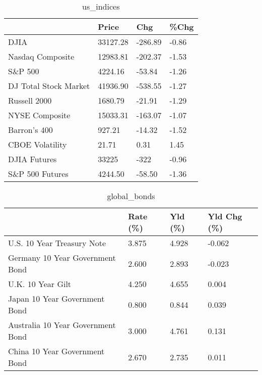 \documentclass{article}%
\begin{document}
%


\begin{table}[htbp]%
\caption{us\_indices}%
\centering%
\begin{adjustbox}{width=1\textwidth}%
\begin{tabular}{llll}
\toprule
                      &    Price &     Chg &  \%Chg \\
\midrule
                 DJIA & 33127.28 & -286.89 & -0.86 \\
     Nasdaq Composite & 12983.81 & -202.37 & -1.53 \\
              S\&P 500 &  4224.16 &  -53.84 & -1.26 \\
DJ Total Stock Market & 41936.90 & -538.55 & -1.27 \\
         Russell 2000 &  1680.79 &  -21.91 & -1.29 \\
       NYSE Composite & 15033.31 & -163.07 & -1.07 \\
         Barron's 400 &   927.21 &  -14.32 & -1.52 \\
      CBOE Volatility &    21.71 &    0.31 &  1.45 \\
         DJIA Futures &    33225 &    -322 & -0.96 \\
      S\&P 500 Futures &  4244.50 &  -58.50 & -1.36 \\
\bottomrule
\end{tabular}
%
\end{adjustbox}%
\end{table}

%


\begin{table}[htbp]%
\caption{global\_bonds}%
\centering%
\begin{adjustbox}{width=1\textwidth}%
\begin{tabular}{llll}
\toprule
                                  & Rate (\%) & Yld (\%) & Yld Chg (\%) \\
\midrule
       U.S. 10 Year Treasury Note &    3.875 &   4.928 &      -0.062 \\
  Germany 10 Year Government Bond &    2.600 &   2.893 &      -0.023 \\
                U.K. 10 Year Gilt &    4.250 &   4.655 &       0.004 \\
    Japan 10 Year Government Bond &    0.800 &   0.844 &       0.039 \\
Australia 10 Year Government Bond &    3.000 &   4.761 &       0.131 \\
    China 10 Year Government Bond &    2.670 &   2.735 &       0.011 \\
\bottomrule
\end{tabular}
%
\end{adjustbox}%
\end{table}
\end{document}
